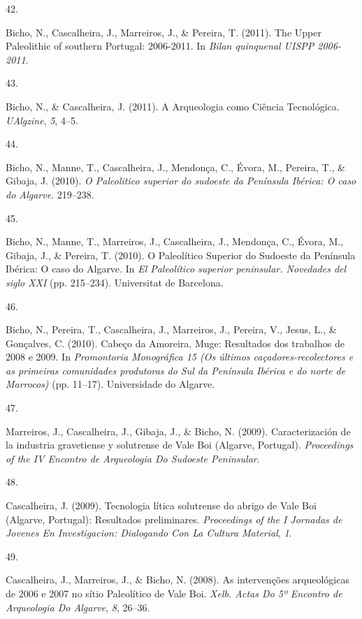 \documentclass[11pt,a4paper,]{awesome-cv}
\newlength{\cslhangindent}
\newlength{\csllabelwidth}
\newenvironment{CSLReferences}[2] %
 {\begin{list}{}{%
  \setlength{\itemindent}{0pt}
  \setlength{\leftmargin}{0pt}
  \setlength{\parsep}{0pt}
  \ifodd #1
   \setlength{\leftmargin}{\cslhangindent}
   \setlength{\itemindent}{-1\cslhangindent}
  \fi
  \setlength{\itemsep}{#2\baselineskip}}}
 {\end{list}}
\newcommand{\CSLLeftMargin}[1]{\parbox[t]{\csllabelwidth}{\strut#1\strut}}
\newcommand{\CSLRightInline}[1]{\parbox[t]{\linewidth - \csllabelwidth}{\strut#1\strut}}
\begin{document}
\begin{CSLReferences}{0}{0}
\CSLLeftMargin{42. }%
\CSLRightInline{Bicho, N., Cascalheira, J., Marreiros, J., \& Pereira,
T. (2011). The Upper Paleolithic of southern Portugal: 2006-2011. In
\emph{Bilan quinquenal UISPP 2006-2011}.}

\CSLLeftMargin{43. }%
\CSLRightInline{Bicho, N., \& Cascalheira, J. (2011). A Arqueologia como
Ciência Tecnológica. \emph{UAlgzine}, \emph{5}, 4--5.}

\CSLLeftMargin{44. }%
\CSLRightInline{Bicho, N., Manne, T., Cascalheira, J., Mendonça, C.,
Évora, M., Pereira, T., \& Gibaja, J. (2010). \emph{O Paleolitico
superior do sudoeste da Península Ibérica: O caso do Algarve}.
219--238.}

\CSLLeftMargin{45. }%
\CSLRightInline{Bicho, N., Manne, T., Marreiros, J., Cascalheira, J.,
Mendonça, C., Évora, M., Gibaja, J., \& Pereira, T. (2010). O
Paleolítico Superior do Sudoeste da Península Ibérica: O caso do
Algarve. In \emph{El Paleolítico superior peninsular. Novedades del
siglo XXI} (pp. 215--234). Universitat de Barcelona.}

\CSLLeftMargin{46. }%
\CSLRightInline{Bicho, N., Pereira, T., Cascalheira, J., Marreiros, J.,
Pereira, V., Jesus, L., \& Gonçalves, C. (2010). Cabeço da Amoreira,
Muge: Resultados dos trabalhos de 2008 e 2009. In \emph{Promontoria
Monográfica 15 (Os últimos caçadores-recolectores e as primeiras
comunidades produtoras do Sul da Península Ibérica e do norte de
Marrocos)} (pp. 11--17). Universidade do Algarve.}

\CSLLeftMargin{47. }%
\CSLRightInline{Marreiros, J., Cascalheira, J., Gibaja, J., \& Bicho, N.
(2009). Caracterización de la industria gravetiense y solutrense de Vale
Boi (Algarve, Portugal). \emph{Proceedings of the IV Encontro de
Arqueologia Do Sudoeste Peninsular}.}

\CSLLeftMargin{48. }%
\CSLRightInline{Cascalheira, J. (2009). Tecnologia lítica solutrense do
abrigo de Vale Boi (Algarve, Portugal): Resultados preliminares.
\emph{Proceedings of the I Jornadas de Jovenes En Investigacion:
Dialogando Con La Cultura Material}, \emph{1}.}

\CSLLeftMargin{49. }%
\CSLRightInline{Cascalheira, J., Marreiros, J., \& Bicho, N. (2008). As
intervenções arqueológicas de 2006 e 2007 no sítio Paleolítico de Vale
Boi. \emph{Xelb. Actas Do 5º Encontro de Arqueologia Do Algarve},
\emph{8}, 26--36.}

\end{CSLReferences}
\end{document}
